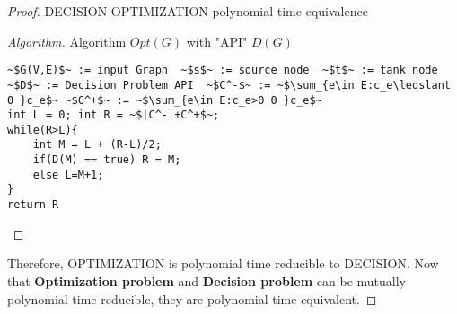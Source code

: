 \documentclass[openany]{article}
\begin{document}
\begin{proof}{}{DECISION-OPTIMIZATION polynomial-time equivalence}
\begin{proof}[Algorithm]{}
		\renewcommand{\qedsymbol}{}
		Algorithm $Opt(G)$ with "API" $D(G)$
		\begin{lstlisting}[basicstyle=\fontsize{8}{9}\selectfont\ttfamily]
~$G(V,E)$~ := input Graph  ~$s$~ := source node  ~$t$~ := tank node
~$D$~ := Decision Problem API  ~$C^-$~ := ~$\sum_{e\in E:c_e\leqslant 0 }c_e$~ ~$C^+$~ := ~$\sum_{e\in E:c_e>0 0 }c_e$~
int L = 0; int R = ~$|C^-|+C^+$~;
while(R>L){
    int M = L + (R-L)/2;
    if(D(M) == true) R = M;
    else L=M+1;
}
return R
		\end{lstlisting} 
\end{proof}

Therefore,   OPTIMIZATION is polynomial time reducible to DECISION.
Now that \textbf{Optimization problem} and \textbf{Decision problem} can be mutually polynomial-time reducible, they are polynomial-time equivalent.
\end{proof}
\end{document}
